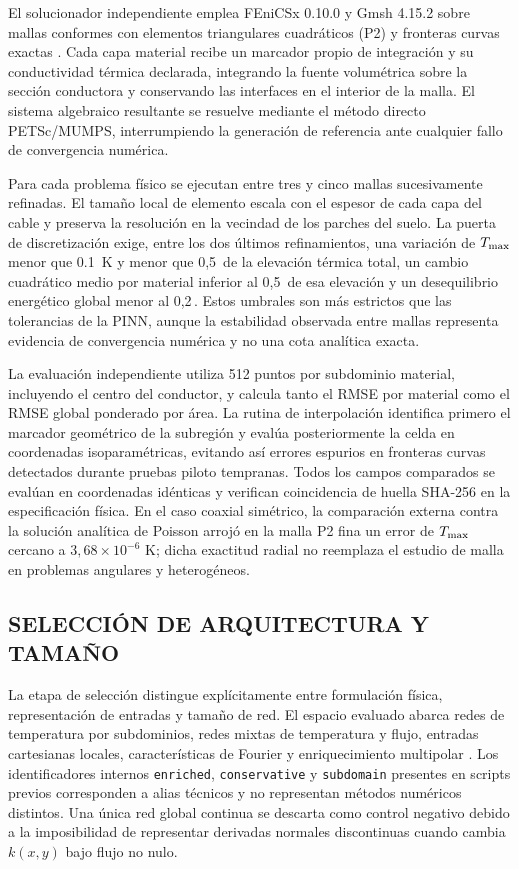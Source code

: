 El solucionador independiente emplea FEniCSx 0.10.0 y Gmsh 4.15.2 sobre mallas conformes con elementos triangulares cuadráticos (P2) y fronteras curvas exactas \parencite{baratta2023dolfinx}. Cada capa material recibe un marcador propio de integración y su conductividad térmica declarada, integrando la fuente volumétrica sobre la sección conductora y conservando las interfaces en el interior de la malla. El sistema algebraico resultante se resuelve mediante el método directo PETSc/MUMPS, interrumpiendo la generación de referencia ante cualquier fallo de convergencia numérica.

Para cada problema físico se ejecutan entre tres y cinco mallas sucesivamente refinadas. El tamaño local de elemento escala con el espesor de cada capa del cable y preserva la resolución en la vecindad de los parches del suelo. La puerta de discretización exige, entre los dos últimos refinamientos, una variación de $T_{\max}$ menor que \SI{0,1}{\kelvin} y menor que 0,5\,\pct{} de la elevación térmica total, un cambio cuadrático medio por material inferior al 0,5\,\pct{} de esa elevación y un desequilibrio energético global menor al 0,2\,\pct{}. Estos umbrales son más estrictos que las tolerancias de la PINN, aunque la estabilidad observada entre mallas representa evidencia de convergencia numérica y no una cota analítica exacta.

La evaluación independiente utiliza 512 puntos por subdominio material, incluyendo el centro del conductor, y calcula tanto el RMSE por material como el RMSE global ponderado por área. La rutina de interpolación identifica primero el marcador geométrico de la subregión y evalúa posteriormente la celda en coordenadas isoparamétricas, evitando así errores espurios en fronteras curvas detectados durante pruebas piloto tempranas. Todos los campos comparados se evalúan en coordenadas idénticas y verifican coincidencia de huella SHA-256 en la especificación física. En el caso coaxial simétrico, la comparación externa contra la solución analítica de Poisson arrojó en la malla P2 fina un error de $T_{\max}$ cercano a $3,68\times10^{-6}$ K; dicha exactitud radial no reemplaza el estudio de malla en problemas angulares y heterogéneos.

\subsection{SELECCIÓN DE ARQUITECTURA Y TAMAÑO}
\label{sec:seleccion-pinn}

La etapa de selección distingue explícitamente entre formulación física, representación de entradas y tamaño de red. El espacio evaluado abarca redes de temperatura por subdominios, redes mixtas de temperatura y flujo, entradas cartesianas locales, características de Fourier y enriquecimiento multipolar \parencite{wang2020fourier}. Los identificadores internos \texttt{enriched}, \texttt{conservative} y \texttt{subdomain} presentes en scripts previos corresponden a alias técnicos y no representan métodos numéricos distintos. Una única red global continua se descarta como control negativo debido a la imposibilidad de representar derivadas normales discontinuas cuando cambia $k(x,y)$ bajo flujo no nulo.

